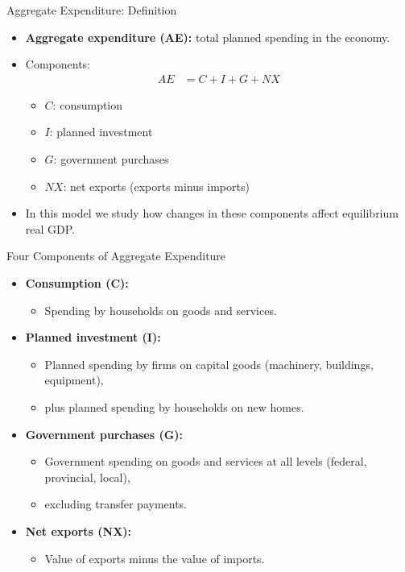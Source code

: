 \documentclass[aspectratio=169]{beamer}
\begin{document}
\begin{frame}{Aggregate Expenditure: Definition}
\transfade
\begin{itemize}[<+->]
  \item \textbf{Aggregate expenditure (AE):} total planned spending in the economy.
  \item Components:
  \begin{align*}
    AE &= C + I + G + NX
  \end{align*}
  \begin{itemize}[<+->]
    \item \(C\): consumption
    \item \(I\): planned investment
    \item \(G\): government purchases
    \item \(NX\): net exports (exports minus imports)
  \end{itemize}
  \item In this model we study how changes in these components affect equilibrium real GDP.
\end{itemize}
\end{frame}

\begin{frame}{Four Components of Aggregate Expenditure}
\transfade
\begin{itemize}[<+->]
  \item \textbf{Consumption (C):}
  \begin{itemize}[<+->]
    \item Spending by households on goods and services.
  \end{itemize}
  \item \textbf{Planned investment (I):}
  \begin{itemize}[<+->]
    \item Planned spending by firms on capital goods (machinery, buildings, equipment),
    \item plus planned spending by households on new homes.
  \end{itemize}
  \item \textbf{Government purchases (G):}
  \begin{itemize}[<+->]
    \item Government spending on goods and services at all levels (federal, provincial, local),
    \item excluding transfer payments.
  \end{itemize}
  \item \textbf{Net exports (NX):}
  \begin{itemize}[<+->]
    \item Value of exports minus the value of imports.
  \end{itemize}
\end{itemize}
\end{frame}
\end{document}
